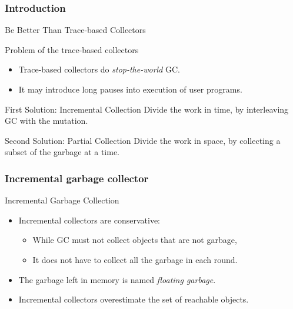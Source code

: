 \begin{bibunit}[apalike]
\subsubsection{Introduction}

\begin{frame}{Be Better Than Trace-based Collectors}
	\begin{alertblock}{Problem of the trace-based collectors}
		\begin{itemize}
		\item Trace-based collectors do \emph{stop-the-world} GC.
		\item It may introduce long pauses into execution of user programs.
		\end{itemize}
	\end{alertblock}
	\vfill
	\begin{block}{First Solution: Incremental Collection}
		Divide the work in time, by interleaving GC with the mutation.
	\end{block}
	\vfill
	\begin{block}{Second Solution: Partial Collection}
		Divide the work in space, by collecting a subset of the garbage at a time.
	\end{block}
\end{frame}

\subsubsection{Incremental garbage collector}

\tableofcontentslide[sections={4-6},sectionstyle={show/shaded},subsectionstyle={show/shaded/hide},subsubsectionstyle={show/shaded/hide/hide}]

\begin{frame}{Incremental Garbage Collection}
	\begin{itemize}
	\item Incremental collectors are conservative:
		\begin{itemize}
		\item While GC must not collect objects that are not garbage,
		\item It does not have to collect all the garbage in each round.
		\end{itemize}
	\vfill
	\item The garbage left in memory is named \emph{floating garbage}.
	\item Incremental collectors overestimate the set of reachable objects.
	\end{itemize}
\end{frame}


\end{bibunit}
